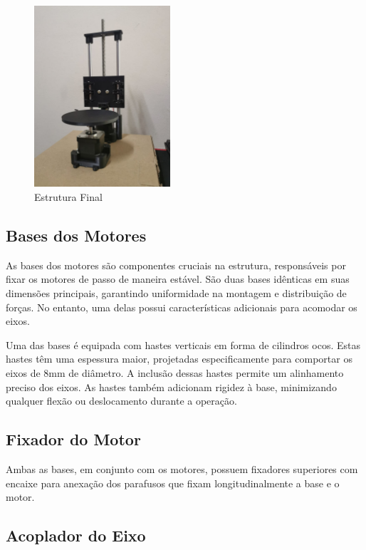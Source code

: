 \begin{figure}[H]
\captionsetup{width=0.6\textwidth}%
\caption{Estrutura Final}%
\label{foto:eletronica_frontal}%
\includegraphics[width=0.45\textwidth]{3.Mecânica/Imagem/Estrutura.jpeg}%
\end{figure}

\subsection{Bases dos Motores}

As bases dos motores são componentes cruciais na estrutura, responsáveis por fixar os motores de passo de maneira estável. São duas bases idênticas em suas dimensões principais, garantindo uniformidade na montagem e distribuição de forças. No entanto, uma delas possui características adicionais para acomodar os eixos.

Uma das bases é equipada com hastes verticais em forma de cilindros ocos. Estas hastes têm uma espessura maior, projetadas especificamente para comportar os eixos de 8mm de diâmetro. A inclusão dessas hastes permite um alinhamento preciso dos eixos. As hastes também adicionam rigidez à base, minimizando qualquer flexão ou deslocamento durante a operação.

\subsection{Fixador do Motor}

Ambas as bases, em conjunto com os motores, possuem fixadores superiores com encaixe para anexação dos parafusos que fixam longitudinalmente a base e o motor.

\subsection{Acoplador do Eixo}

